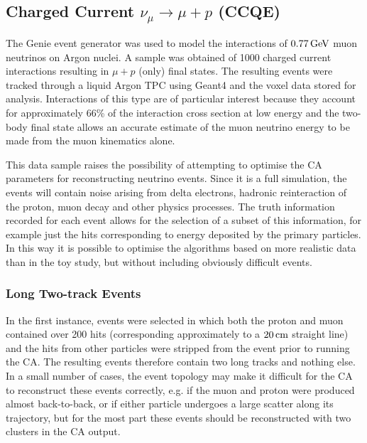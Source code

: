 \subsection{Charged Current $\nu_\mu \rightarrow \mu + p$ (CCQE)}
The Genie event generator was used to model the interactions of $0.77\,\mathrm{GeV}$ muon neutrinos on Argon nuclei. A sample was obtained of 1000 charged current interactions resulting in $\mu + p$ (only) final states. The resulting events were tracked through a liquid Argon TPC using Geant4 and the voxel data stored for analysis. Interactions of this type are of particular interest because they account for approximately 66\% of the interaction cross section at low energy and the two-body final state allows an accurate estimate of the muon neutrino energy to be made from the muon kinematics alone.

This data sample raises the possibility of attempting to optimise the \ac{CA} parameters for reconstructing neutrino events. Since it is a full simulation, the events will contain noise arising from delta electrons, hadronic reinteraction of the proton, muon decay and other physics processes. The truth information recorded for each event allows for the selection of a subset of this information, for example just the hits corresponding to energy deposited by the primary particles. In this way it is possible to optimise the algorithms based on more realistic data than in the toy study, but without including obviously difficult events.

\subsubsection{Long Two-track Events}
In the first instance, events were selected in which both the proton and muon contained over 200 hits (corresponding approximately to a $20\,\mathrm{cm}$ straight line) and the hits from other particles were stripped from the event prior to running the \ac{CA}. The resulting events therefore contain two long tracks and nothing else. In a small number of cases, the event topology may make it difficult for the \ac{CA} to reconstruct these events correctly, e.g. if the muon and proton were produced almost back-to-back, or if either particle undergoes a large scatter along its trajectory, but for the most part these events should be reconstructed with two clusters in the \ac{CA} output.

